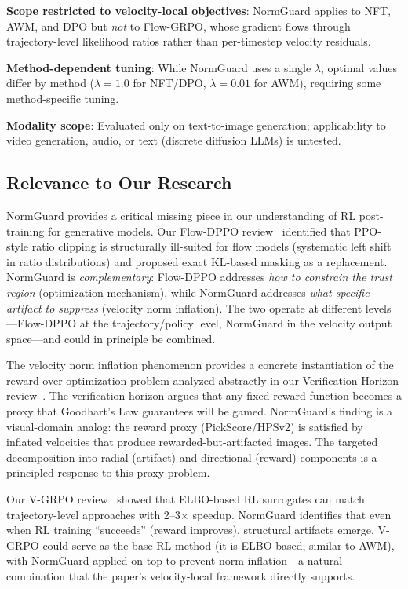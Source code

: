 \documentclass[11pt,a4paper]{article}
\begin{document}
\textbf{Scope restricted to velocity-local objectives}: NormGuard applies to NFT, AWM, and DPO but \emph{not} to Flow-GRPO, whose gradient flows through trajectory-level likelihood ratios rather than per-timestep velocity residuals.

\textbf{Method-dependent tuning}: While NormGuard uses a single $\lambda$, optimal values differ by method ($\lambda=1.0$ for NFT/DPO, $\lambda=0.01$ for AWM), requiring some method-specific tuning.

\textbf{Modality scope}: Evaluated only on text-to-image generation; applicability to video generation, audio, or text (discrete diffusion LLMs) is untested.

\subsection{Relevance to Our Research}

NormGuard provides a critical missing piece in our understanding of RL post-training for generative models. Our Flow-DPPO review~\cite{liu2026flowdppo} identified that PPO-style ratio clipping is structurally ill-suited for flow models (systematic left shift in ratio distributions) and proposed exact KL-based masking as a replacement. NormGuard is \emph{complementary}: Flow-DPPO addresses \emph{how to constrain the trust region} (optimization mechanism), while NormGuard addresses \emph{what specific artifact to suppress} (velocity norm inflation). The two operate at different levels---Flow-DPPO at the trajectory/policy level, NormGuard in the velocity output space---and could in principle be combined.

The velocity norm inflation phenomenon provides a concrete instantiation of the reward over-optimization problem analyzed abstractly in our Verification Horizon review~\cite{qwen2026verification}. The verification horizon argues that any fixed reward function becomes a proxy that Goodhart's Law guarantees will be gamed. NormGuard's finding is a visual-domain analog: the reward proxy (PickScore/HPSv2) is satisfied by inflated velocities that produce rewarded-but-artifacted images. The targeted decomposition into radial (artifact) and directional (reward) components is a principled response to this proxy problem.

Our V-GRPO review~\cite{vgrpo2026} showed that ELBO-based RL surrogates can match trajectory-level approaches with 2--3$\times$ speedup. NormGuard identifies that even when RL training ``succeeds'' (reward improves), structural artifacts emerge. V-GRPO could serve as the base RL method (it is ELBO-based, similar to AWM), with NormGuard applied on top to prevent norm inflation---a natural combination that the paper's velocity-local framework directly supports.
\end{document}
